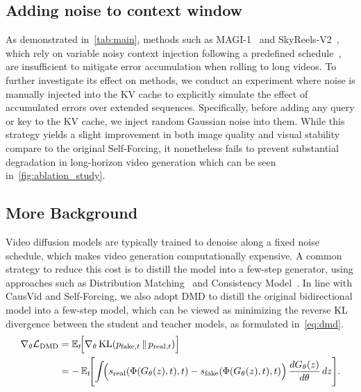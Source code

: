 \subsection{Adding noise to context window}
As demonstrated in~\cref{tab:main}, methods such as MAGI-1~\citep{teng2025magi} and SkyReels-V2~\citep{chen2025skyreels}, which rely on variable noisy context injection following a predefined schedule~\citep{chen2024diffusion}, are insufficient to mitigate error accumulation when rolling to long videos. To further investigate its effect on methods, we conduct an experiment where noise is manually injected into the KV cache to explicitly simulate the effect of accumulated errors over extended sequences. Specifically, before adding any query or key to the KV cache, we inject random Gaussian noise into them. While this strategy yields a slight improvement in both image quality and visual stability compare to the original Self-Forcing, it nonetheless fails to prevent substantial degradation in long-horizon video generation which can be seen in~\cref{fig:ablation_study}.



\subsection{More Background}
\label{sec.appendix.dmd}
Video diffusion models are typically trained to denoise along a fixed noise schedule, which makes video generation computationally expensive. A common strategy to reduce this cost is to distill the model into a few-step generator, using approaches such as Distribution Matching~\citep{yin2024one,yin2024improved,luo2025learning} and Consistency Model~\citep{song2023consistency,wang2024phased}. In line with CausVid and Self-Forcing, we also adopt DMD to distill the original bidirectional model into a few-step model, which can be viewed as minimizing the reverse KL divergence between the student and teacher models, as formulated in~\cref{eq:dmd}.
\begin{equation}
\begin{aligned}
\nabla_{\theta}\mathcal{L}_{\mathrm{DMD}}
&= \mathbb{E}_{t}\!\Bigl[
      \nabla_{\theta}\operatorname{KL}\!\left(
         p_{\mathrm{fake},t}\,\Vert\, p_{\mathrm{real},t}
      \right)
   \Bigr] \\
&= -\,\mathbb{E}_{t}\!\Biggl[
      \int\!\Bigl(
         s_{\mathrm{real}}\!\left(\Phi(G_{\theta}(z),t),t\right)
         - s_{\mathrm{fake}}\!\left(\Phi(G_{\theta}(z),t),t\right)
      \Bigr)\,
      \frac{dG_{\theta}(z)}{d\theta}\,dz
   \Biggr].
\end{aligned}
\label{eq:dmd}
\end{equation}

